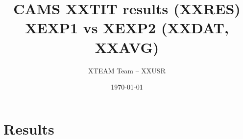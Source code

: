\documentclass{beamer}
\title{CAMS XXTIT results (XXRES) \\ XEXP1 vs XEXP2 (XXDAT, XXAVG)}
\author{{XTEAM Team -- XXUSR 
}}
\date{\today}
\begin{document}
\frame{\titlepage}
\section[Outline]{}
\frame{\tableofcontents}
%
\section{Results}

%
%
\end{document}
